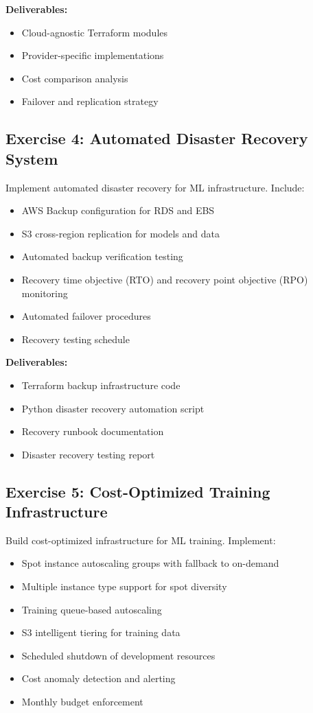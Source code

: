 \textbf{Deliverables:}
\begin{itemize}
    \item Cloud-agnostic Terraform modules
    \item Provider-specific implementations
    \item Cost comparison analysis
    \item Failover and replication strategy
\end{itemize}

\subsection{Exercise 4: Automated Disaster Recovery System}

Implement automated disaster recovery for ML infrastructure. Include:

\begin{itemize}
    \item AWS Backup configuration for RDS and EBS
    \item S3 cross-region replication for models and data
    \item Automated backup verification testing
    \item Recovery time objective (RTO) and recovery point objective (RPO) monitoring
    \item Automated failover procedures
    \item Recovery testing schedule
\end{itemize}

\textbf{Deliverables:}
\begin{itemize}
    \item Terraform backup infrastructure code
    \item Python disaster recovery automation script
    \item Recovery runbook documentation
    \item Disaster recovery testing report
\end{itemize}

\subsection{Exercise 5: Cost-Optimized Training Infrastructure}

Build cost-optimized infrastructure for ML training. Implement:

\begin{itemize}
    \item Spot instance autoscaling groups with fallback to on-demand
    \item Multiple instance type support for spot diversity
    \item Training queue-based autoscaling
    \item S3 intelligent tiering for training data
    \item Scheduled shutdown of development resources
    \item Cost anomaly detection and alerting
    \item Monthly budget enforcement
\end{itemize}

